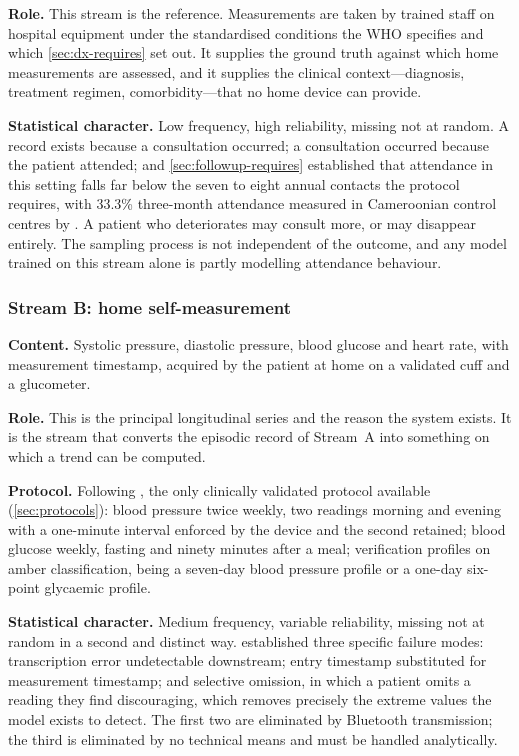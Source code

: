 \documentclass[12pt,a4paper,oneside]{report}
\begin{document}
\textbf{Role.} This stream is the reference. Measurements are taken by trained staff on hospital equipment under the standardised conditions the WHO specifies and which \cref{sec:dx-requires} set out. It supplies the ground truth against which home measurements are assessed, and it supplies the clinical context---diagnosis, treatment regimen, comorbidity---that no home device can provide.

\textbf{Statistical character.} Low frequency, high reliability, missing not at random. A record exists because a consultation occurred; a consultation occurred because the patient attended; and \cref{sec:followup-requires} established that attendance in this setting falls far below the seven to eight annual contacts the protocol requires, with 33.3\% three-month attendance measured in Cameroonian control centres by \textcite{bediang2021}. A patient who deteriorates may consult more, or may disappear entirely. The sampling process is not independent of the outcome, and any model trained on this stream alone is partly modelling attendance behaviour.

\subsubsection{Stream B: home self-measurement}

\textbf{Content.} Systolic pressure, diastolic pressure, blood glucose and heart rate, with measurement timestamp, acquired by the patient at home on a validated cuff and a glucometer.

\textbf{Role.} This is the principal longitudinal series and the reason the system exists. It is the stream that converts the episodic record of Stream~A into something on which a trend can be computed.

\textbf{Protocol.} Following \textcite{mihevc2025}, the only clinically validated protocol available (\cref{sec:protocols}): blood pressure twice weekly, two readings morning and evening with a one-minute interval enforced by the device and the second retained; blood glucose weekly, fasting and ninety minutes after a meal; verification profiles on amber classification, being a seven-day blood pressure profile or a one-day six-point glycaemic profile.

\textbf{Statistical character.} Medium frequency, variable reliability, missing not at random in a second and distinct way.  established three specific failure modes: transcription error undetectable downstream; entry timestamp substituted for measurement timestamp; and selective omission, in which a patient omits a reading they find discouraging, which removes precisely the extreme values the model exists to detect. The first two are eliminated by Bluetooth transmission; the third is eliminated by no technical means and must be handled analytically.
\end{document}
